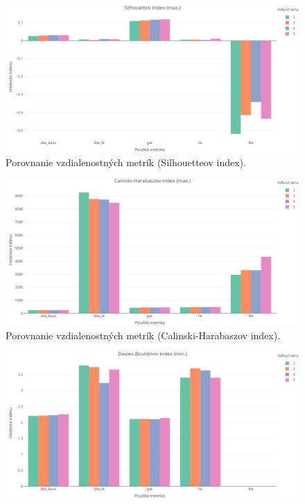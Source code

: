 \documentclass[a4paper,twoside,slovak,12pt,appendix]{article}
\begin{document}
\begin{appendices}
\begin{figure}[htbp]
  \centering
  \includegraphics[width=\textwidth]{cvi/metric_comparison/201902271851-Sil-metric_comparison.png}
  \caption{Porovnanie vzdialenostných metrík (Silhouetteov index).}
\end{figure}
\begin{figure}[htbp]
  \centering
  \includegraphics[width=\textwidth]{cvi/metric_comparison/201902271851-CH-metric_comparison.png}
  \caption{Porovnanie vzdialenostných metrík (Calinski-Harabaszov index).}
\end{figure}
\begin{figure}[htbp]
  \centering
  \includegraphics[width=\textwidth]{cvi/metric_comparison/201902271851-DB-metric_comparison.png}

\end{figure}
\end{appendices}
\end{document}
